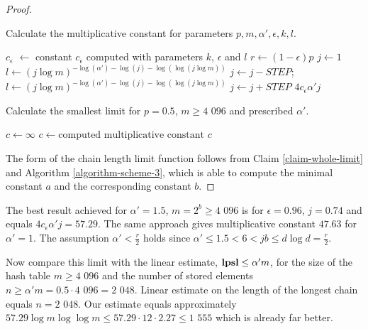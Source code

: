 \begin{proof}
\begin{algorithm}[H]
\caption{Calculate the multiplicative constant for parameters $p, m, \alpha', \epsilon, k, l$.}
\label{procedure-scheme-3}
\begin{algorithmic}
\STATE $c_\epsilon$ $\leftarrow$ constant $c_\epsilon$ computed with parameters $k$, $\epsilon$ and $l$
\STATE $r \leftarrow (1 - \epsilon)p$ 
\STATE $j \leftarrow 1$
\STATE 
\STATE {}
\STATE $l \leftarrow (j \log m) ^ {-\log(\alpha') - \log(j) - \log(\log(j \log m))}$
	\STATE $j \leftarrow j - STEP$;
	\STATE $l \leftarrow (j \log m) ^ {-\log(\alpha') - \log(j) - \log(\log(j \log m))}$
\ENDWHILE
\STATE
\STATE $j \leftarrow j + STEP$
\RETURN $4 c_\epsilon \alpha' j$
\end{algorithmic}
\end{algorithm}

\begin{algorithm}[H]
\caption{Calculate the smallest limit for $p=0.5$, $m \geq \text{4 096}$ and prescribed $\alpha'$.}
\label{algorithm-scheme-3}
\begin{algorithmic}
\STATE $c \leftarrow \infty$
				\STATE $c \leftarrow \text{computed multiplicative constant}$
			\ENDIF
		\ENDFOR
	\ENDFOR
\ENDFOR
\STATE
\RETURN $c$
\end{algorithmic}
\end{algorithm}

The form of the chain length limit function follows from Claim \ref{claim-whole-limit} and Algorithm \ref{algorithm-scheme-3}, which is able to compute the minimal constant $a$ and the corresponding constant $b$.
\end{proof}

The best result achieved for $\alpha' = 1.5$, $m = 2 ^ b \geq \text{4 096}$ is for $\epsilon = 0.96$, $j = 0.74$ and equals $4 c_\epsilon \alpha' j = 57.29$. The same approach gives multiplicative constant $47.63$ for $\alpha' = 1$. The assumption $\alpha' < \frac{r}{2}$ holds since $\alpha' \leq 1.5 < 6 < jb \leq d \log d = \frac{r}{2}$.

Now compare this limit with the linear estimate, $\mathbf{lpsl} \leq \alpha' m$, for the size of the hash table $m \geq \text{4 096}$ and the number of stored elements $n \geq \alpha' m = 0.5 \cdot \text{4 096} = \text{2 048}$. Linear estimate on the length of the longest chain equals $n = \text{2 048}$. Our estimate equals approximately $57.29 \log m \log \log m \leq 57.29 \cdot 12 \cdot 2.27 \leq \text{1 555}$ which is already far better. 

